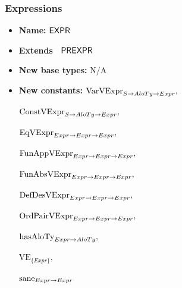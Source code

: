 \documentclass[xcolor={dvipsnames}]{beamer}
\begin{document}
\begin{frame}
\frametitle{Expressions}
\footnotesize
\vspace{-2mm}
\begin{thyext}[Expressions]
\noindent
\begin{itemize} \setlength{\itemsep}{0pt}\vspace{-0.5cm}
\item[]\hspace{-3ex}\textbf{Name:} $\mathsf{EXPR}$
\item[]\hspace{-3ex}\textbf{Extends\ } $\mathsf{PREXPR}$
\item[]\hspace{-3ex}\textbf{New base types:} N/A
\item[]\hspace{-3ex}\textbf{New constants:}\newline
$\text{VarVExpr}_{{S} \rightarrow {{AloTy} \rightarrow {Expr}}},$
\vspace{-1mm}

$\text{ConstVExpr}_{{S} \rightarrow {{AloTy} \rightarrow {Expr}}},$
\vspace{-1mm}

$\text{EqVExpr}_{{Expr} \rightarrow {{Expr} \rightarrow {Expr}}},$
\vspace{-1mm}

$\text{FunAppVExpr}_{{Expr} \rightarrow {{Expr} \rightarrow {Expr}}},$
\vspace{-1mm}

$\text{FunAbsVExpr}_{{Expr} \rightarrow {{Expr} \rightarrow {Expr}}},$
\vspace{-1mm}

$\text{DefDesVExpr}_{{Expr} \rightarrow {{Expr} \rightarrow {Expr}}},$
\vspace{-1mm}

$\text{OrdPairVExpr}_{{Expr} \rightarrow {{Expr} \rightarrow {Expr}}},$
\vspace{-1mm}

$\text{hasAloTy}_{{Expr} \rightarrow {AloTy}},$
\vspace{-1mm}

$\text{VE}_{\{Expr\}},$
\vspace{-1mm}

$\text{sane}_{{Expr} \rightarrow {Expr}}$
\end{itemize}
\end{thyext}
\end{frame}
\end{document}
